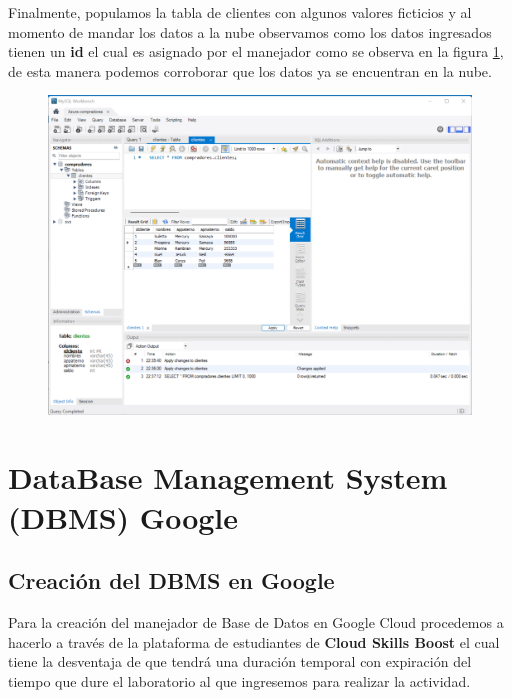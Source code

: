 \documentclass[12pt,a4paper]{article}
\begin{document}
Finalmente, populamos la tabla de clientes con algunos valores ficticios y al momento de mandar los datos a la nube observamos como los datos ingresados tienen un \textbf{id} el cual es asignado por el manejador como se observa en la figura \ref{fig:1_3_3_Azure_DBMS}, de esta manera podemos corroborar que los datos ya se encuentran en la nube.

\begin{figure}[H]
    \centering
    \includegraphics[width=1\linewidth]{M4_Servicios_Cómputo_en_la_Nube/Tarea_6_Creación_sistema_administración_Base_de_Datos/reporte/figuras/1_3_3_Azure_DBMS.png}
    \label{fig:1_3_3_Azure_DBMS}
\end{figure}

\vspace{10em}

\section{DataBase Management System (DBMS) Google}

\subsection{Creación del DBMS en Google}

Para la creación del manejador de Base de Datos en Google Cloud procedemos a hacerlo a través de la plataforma de estudiantes de \textbf{Cloud Skills Boost} el cual tiene la desventaja de que tendrá una duración temporal con expiración del tiempo que dure el laboratorio al que ingresemos para realizar la actividad.
\end{document}
